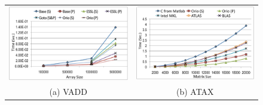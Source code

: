 \documentclass[runningheads]{llncs}
\begin{document}
\begin{figure}[htp]
{\small
\centering
\begin{tabular}{cc}

\begin{minipage}[b]{.5\textwidth}
\includegraphics[width=\textwidth]{figures/vadd_bgp_time2.pdf}
\end{minipage}
&
\begin{minipage}[b]{.5\textwidth}
\includegraphics[width=\textwidth]{figures/atax.pdf}
\end{minipage}\\

(a) VADD & (b) ATAX \\


\end{tabular}}
\end{figure}
\end{document}
